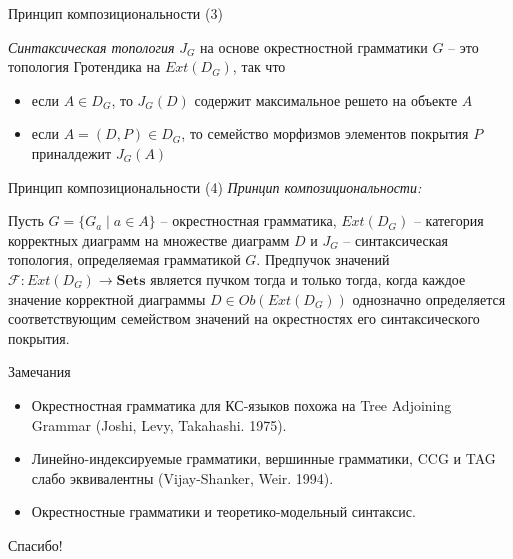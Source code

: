 \documentclass{beamer}
\begin{document}
\begin{frame}{Принцип композициональности (3)}
\begin{small}
\textit{Синтаксическая топология} $J_G$ на основе окрестностной грамматики $G$ -- это топология Гротендика на $Ext(D_G)$, так что\\
\medskip
\begin{itemize}
	\item если $A \in D_G$, то $J_G(D)$ содержит максимальное решето на объекте $A$
	\item если $A = (D, P) \in D_G$, то семейство морфизмов элементов покрытия $P$ приналдежит $J_G(A)$
\end{itemize}
\end{small}
\end{frame}

\begin{frame}{Принцип композициональности (4)}
\textit{Принцип композициональности:}\\
\medskip
\begin{block}{}
\justifying
\begin{small}
Пусть $G = \{ G_a \; \vert \; a \in A \}$ -- окрестностная грамматика, $Ext(D_G)$ -- категория корректных диаграмм на множестве диаграмм $D$ и $J_G$ -- синтаксическая топология, определяемая грамматикой $G$. Предпучок значений $\mathcal{F} : Ext(D_G) \to \textbf{Sets}$ является пучком тогда и только тогда, когда каждое значение корректной диаграммы $D \in Ob(Ext(D_G))$ однозначно определяется соответствующим семейством значений на окрестностях его синтаксического покрытия.
\end{small}
\end{block}
\end{frame}

\begin{frame}{Замечания}
\medskip
\begin{small}
\begin{itemize}
	\item Окрестностная грамматика для КС-языков похожа на Tree Adjoining Grammar (Joshi, Levy, Takahashi. 1975).
	\item Линейно-индексируемые грамматики, вершинные грамматики, CCG и TAG слабо эквивалентны (Vijay-Shanker, Weir. 1994).
	\item Окрестностные грамматики и теоретико-модельный синтаксис.
\end{itemize}
\end{small}
\end{frame}



\begin{frame}{}
    \thispagestyle{empty}
    \begin{center}
        {\large Спасибо!}
    \end{center}
\end{frame}


\end{document}
